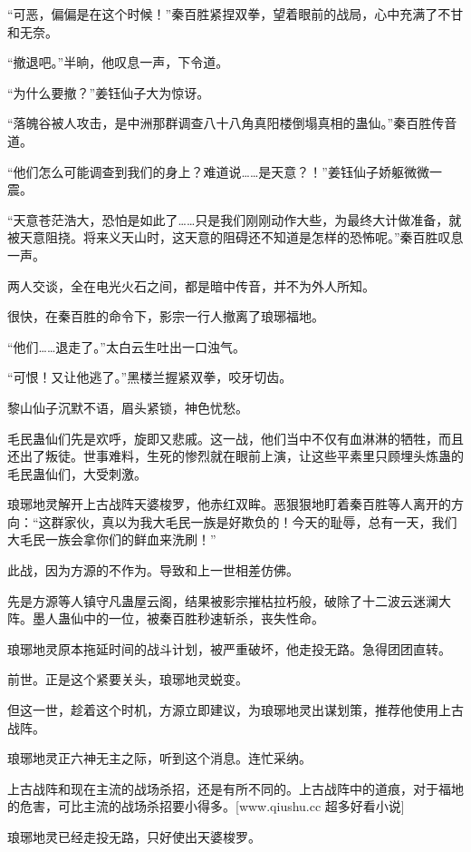 
\begin{this_body}

“可恶，偏偏是在这个时候！”秦百胜紧捏双拳，望着眼前的战局，心中充满了不甘和无奈。

“撤退吧。”半晌，他叹息一声，下令道。

“为什么要撤？”姜钰仙子大为惊讶。

“落魄谷被人攻击，是中洲那群调查八十八角真阳楼倒塌真相的蛊仙。”秦百胜传音道。

“他们怎么可能调查到我们的身上？难道说……是天意？！”姜钰仙子娇躯微微一震。

“天意苍茫浩大，恐怕是如此了……只是我们刚刚动作大些，为最终大计做准备，就被天意阻挠。将来义天山时，这天意的阻碍还不知道是怎样的恐怖呢。”秦百胜叹息一声。

两人交谈，全在电光火石之间，都是暗中传音，并不为外人所知。

很快，在秦百胜的命令下，影宗一行人撤离了琅琊福地。

“他们……退走了。”太白云生吐出一口浊气。

“可恨！又让他逃了。”黑楼兰握紧双拳，咬牙切齿。

黎山仙子沉默不语，眉头紧锁，神色忧愁。

毛民蛊仙们先是欢呼，旋即又悲戚。这一战，他们当中不仅有血淋淋的牺牲，而且还出了叛徒。世事难料，生死的惨烈就在眼前上演，让这些平素里只顾埋头炼蛊的毛民蛊仙们，大受刺激。

琅琊地灵解开上古战阵天婆梭罗，他赤红双眸。恶狠狠地盯着秦百胜等人离开的方向：“这群家伙，真以为我大毛民一族是好欺负的！今天的耻辱，总有一天，我们大毛民一族会拿你们的鲜血来洗刷！”

此战，因为方源的不作为。导致和上一世相差仿佛。

先是方源等人镇守凡蛊屋云阁，结果被影宗摧枯拉朽般，破除了十二波云迷澜大阵。墨人蛊仙中的一位，被秦百胜秒速斩杀，丧失性命。

琅琊地灵原本拖延时间的战斗计划，被严重破坏，他走投无路。急得团团直转。

前世。正是这个紧要关头，琅琊地灵蜕变。

但这一世，趁着这个时机，方源立即建议，为琅琊地灵出谋划策，推荐他使用上古战阵。

琅琊地灵正六神无主之际，听到这个消息。连忙采纳。

上古战阵和现在主流的战场杀招，还是有所不同的。上古战阵中的道痕，对于福地的危害，可比主流的战场杀招要小得多。[www.qiushu.cc 超多好看小说]

琅琊地灵已经走投无路，只好使出天婆梭罗。


\end{this_body}
